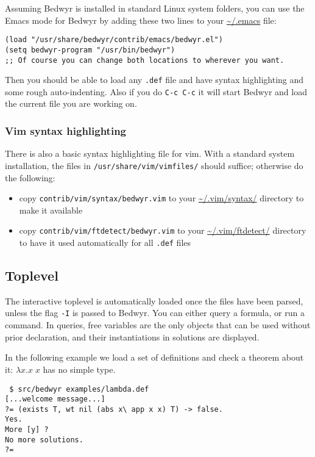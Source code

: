 \documentclass{article}
\begin{document}
Assuming Bedwyr is installed in standard Linux system folders, you can
use the Emacs mode for Bedwyr by adding these two lines to your
\url{~/.emacs} file:
\begin{verbatim}
(load "/usr/share/bedwyr/contrib/emacs/bedwyr.el")
(setq bedwyr-program "/usr/bin/bedwyr")
;; Of course you can change both locations to wherever you want.
\end{verbatim}

Then you should be able to load any \verb:.def: file
and have syntax highlighting and some rough auto-indenting.
Also if you do \verb.C-c C-c. it will start Bedwyr
and load the current file you are working on.

\subsubsection{Vim syntax highlighting}

There is also a basic syntax highlighting file for vim. With a standard
system installation, the files in \verb+/usr/share/vim/vimfiles/+ should
suffice; otherwise do the following:
\begin{itemize}
  \item copy {\tt contrib/vim/syntax/bedwyr.vim} to
    your \url{~/.vim/syntax/} directory to make it available
  \item copy {\tt contrib/vim/ftdetect/bedwyr.vim} to
    your \url{~/.vim/ftdetect/} directory to have it used automatically
    for all {\tt *.def} files
\end{itemize}

\subsection{Toplevel}

The interactive toplevel is automatically loaded once the files have
been parsed, unless the flag \verb.-I. is passed to Bedwyr. You can
either query a formula, or run a command. In queries, free variables are
the only objects that can be used without prior declaration, and their
instantiations in solutions are displayed.

In the following example we load a set of definitions and check a
theorem about it: $\lambda x.x\;x$ has no simple type.

\begin{verbatim}
 $ src/bedwyr examples/lambda.def
[...welcome message...]
?= (exists T, wt nil (abs x\ app x x) T) -> false.
Yes.
More [y] ?
No more solutions.
?=
\end{verbatim}
\end{document}

